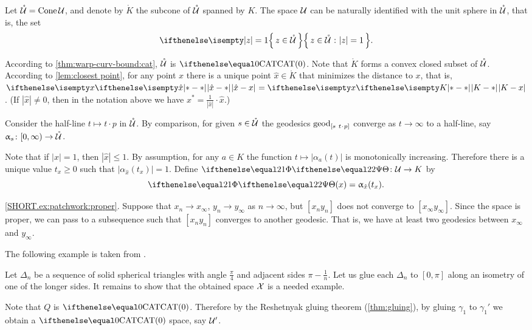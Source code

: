 Let $\mathring{\mathcal{U}}=\mathop{\rm Cone}\nolimits \mathcal{U}$, and 
denote by $\mathring{K}$ the subcone of $\mathring{\mathcal{U}}$ spanned by $K$.
The space $\mathcal{U}$ can be naturally identified with the unit sphere in $\mathring{\mathcal{U}}$, 
that is, the set 
\[\set{z\in \mathring{\spc{U}}}{|z|=1}.\]

According to \ref{thm:warp-curv-bound:cat}, $\mathring{\mathcal{U}}$ is $\CAT0$.
Note that $\mathring{K}$ forms a convex closed subset of $\mathring{\mathcal{U}}$.
According to \ref{lem:closest point}, for any point $x$ there is a unique point $\hat x\in \mathring{K}$
that minimizes the distance to $x$,
that is, $\dist{\hat x}{x}{}=\dist{K}{x}{}$.
(If $|\hat x|\ne0$, then in the notation above we have
$x^*=\tfrac1{|\hat x|}\cdot\hat x$.)

Consider the half-line $t\mapsto t\cdot p$ in  $\mathring{\mathcal{U}}$.
By comparison, 
for given $s\in \mathring{\spc{U}}$
the geodesics $\geod_{[s\ t\cdot p]}$ converge as $t\to\infty$ to a half-line, 
say $\alpha_s\:[0,\infty)\to \mathring{\spc{U}}$.



Note that if $|x|=1$, then $|\hat x|\le 1$.
By assumption, for any $a\in K$ the function $t\mapsto |\alpha_a(t)|$ is monotonically increasing.
Therefore there is a unique value $t_x\ge 0$ such that
$|\alpha_{\hat x}(t_x)|=1$.
Define $\map[2]\:\spc{U}\to K$
 by 
\[\map[2](x)=\alpha_{\hat x}(t_x).\]

\parbf{\ref{ex:patchwork};} \ref{SHORT.ex:patchwork:proper}.
Suppose that $x_n\to x_\infty$, $y_n\to y_\infty$ as $n\to\infty$,
but $[x_ny_n]$ does not converge to $[x_\infty y_\infty]$.
Since the space is proper, we can pass to a subsequence such that $[x_ny_n]$ converges to another geodesic.
That is, we have at least two geodesics between $x_\infty$ and $y_\infty$.

 The following example is taken from \cite[Chapter I, Exercise 3.14]{bridson-haefliger}.

Let $\Delta_n$ be a sequence of solid spherical triangles 
with angle $\tfrac\pi4$ and adjacent sides $\pi-\tfrac1n$.
Let us glue each $\Delta_n$ to $[0,\pi]$ along an isometry of one of the longer sides.
It remains to show that the obtained space $\mathcal{X}$ is a needed example.

Note that 
$Q$ 
is $\CAT0$.
Therefore by the Reshetnyak gluing theorem (\ref{thm:gluing}),
by gluing 
$\gamma_1$ 
to $\gamma_1'$ 
we obtain a $\CAT0$ space, say $\mathcal{U}'$.


